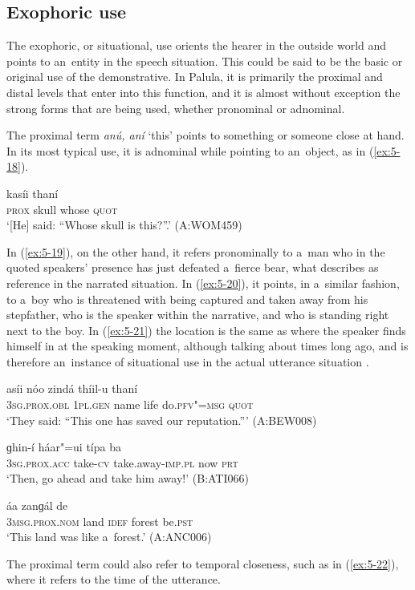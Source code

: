 \subsection{Exophoric use}
\label{subsec:5-2-3}

The exophoric, or situational, use orients the hearer in the outside world and points to an~entity in the speech situation. This could be said to be the basic or original use of the demonstrative. In Palula, it is primarily the proximal and distal levels that enter into this function, and it is almost without exception the strong forms that are being used, whether pronominal or adnominal.


The proximal term \textit{anú, aní} `this' points to something or someone close at hand. In its most typical use, it is adnominal while pointing to an~object, as in (\ref{ex:5-18}).

\begin{exe}
\ex
\label{ex:5-18}
 kasíi thaní \\
\textsc{prox} skull whose \textsc{quot} \\
\glt `[He] said: ``Whose skull is this?''.' (A:WOM459)
\end{exe}
In (\ref{ex:5-19}), on the other hand, it refers pronominally to a~man who in the quoted speakers' presence has just defeated a~fierce bear, what \citet[222]{himmelmann1996} describes as reference in the narrated situation. In (\ref{ex:5-20}), it points, in a~similar fashion, to a~boy who is threatened with being captured and taken away from his stepfather, who is the speaker within the narrative, and who is standing right next to the boy. In (\ref{ex:5-21}) the location is the same as where the speaker finds himself in at the speaking moment, although talking about times long ago, and is therefore an~instance of situational use in the actual utterance situation \citep[222]{himmelmann1996}.

\begin{exe}
\ex
\label{ex:5-19}
\gll [aníi] asíi nóo zindá thíil-u thaní \\
\textsc{3sg.prox.obl} \textsc{1pl.gen} name life do.\textsc{pfv"=msg} \textsc{quot} \\
\glt `They said: ``This one has saved our reputation.''' (A:BEW008)

\ex
\label{ex:5-20}
\gll [hanís] ɡhin-í háar"=ui típa ba \\
\textsc{3sg.prox.acc} take-\textsc{cv} take.away-\textsc{imp.pl} now \textsc{prt} \\
\glt `Then, go ahead and take him away!' (B:ATI066)

\ex
\label{ex:5-21}
 áa zanɡál de \\
\textsc{3msg.prox.nom} land \textsc{idef} forest be.\textsc{pst} \\
\glt `This land was like a~forest.' (A:ANC006)
\end{exe}
The proximal term could also refer to temporal closeness, such as in (\ref{ex:5-22}), where it refers to the time of the utterance.

